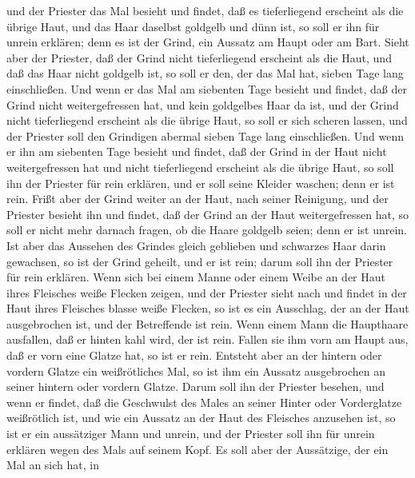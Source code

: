 und der Priester das Mal besieht und findet, daß es
tieferliegend erscheint als die übrige Haut, und das Haar daselbst
goldgelb und dünn ist, so soll er ihn für unrein erklären; denn es ist
der Grind, ein Aussatz am Haupt oder am Bart.  Sieht aber
der Priester, daß der Grind nicht tieferliegend erscheint als die Haut,
und daß das Haar nicht goldgelb ist, so soll er den, der das Mal hat,
sieben Tage lang einschließen.  Und wenn er das Mal am
siebenten Tage besieht und findet, daß der Grind nicht weitergefressen
hat, und kein goldgelbes Haar da ist, und der Grind nicht tieferliegend
erscheint als die übrige Haut,  so soll er sich scheren
lassen, und der Priester soll den Grindigen abermal sieben Tage lang
einschließen.  Und wenn er ihn am siebenten Tage besieht
und findet, daß der Grind in der Haut nicht weitergefressen hat und
nicht tieferliegend erscheint als die übrige Haut, so soll ihn der
Priester für rein erklären, und er soll seine Kleider waschen; denn er
ist rein.  Frißt aber der Grind weiter an der Haut, nach
seiner Reinigung,  und der Priester besieht ihn und
findet, daß der Grind an der Haut weitergefressen hat, so soll er nicht
mehr darnach fragen, ob die Haare goldgelb seien; denn er ist unrein.
 Ist aber das Aussehen des Grindes gleich geblieben und
schwarzes Haar darin gewachsen, so ist der Grind geheilt, und er ist
rein; darum soll ihn der Priester für rein erklären. 
Wenn sich bei einem Manne oder einem Weibe an der Haut ihres Fleisches
weiße Flecken zeigen,  und der Priester sieht nach und
findet in der Haut ihres Fleisches blasse weiße Flecken, so ist es ein
Ausschlag, der an der Haut ausgebrochen ist, und der Betreffende ist
rein.  Wenn einem Mann die Haupthaare ausfallen, daß er
hinten kahl wird, der ist rein.  Fallen sie ihm vorn am
Haupt aus, daß er vorn eine Glatze hat, so ist er rein. 
Entsteht aber an der hintern oder vordern Glatze ein weißrötliches Mal,
so ist ihm ein Aussatz ausgebrochen an seiner hintern oder vordern
Glatze.  Darum soll ihn der Priester besehen, und wenn er
findet, daß die Geschwulst des Males an seiner Hinter oder Vorderglatze
weißrötlich ist, und wie ein Aussatz an der Haut des Fleisches anzusehen
ist,  so ist er ein aussätziger Mann und unrein, und der
Priester soll ihn für unrein erklären wegen des Mals auf seinem Kopf.
 Es soll aber der Aussätzige, der ein Mal an sich hat, in
